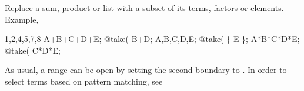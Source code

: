 
Replace a sum, product or list with a subset of its terms, factors or
 elements. Example,
\begin{screen}{1,2,4,5,7,8}
A+B+C+D+E;
@take(%
B+D;
{A,B,C,D,E};
@take(%
\{ E \};
A*B*C*D*E;
@take(%
C*D*E;
\end{screen}
As usual, a range can be open by setting the second boundary to .
In order to select terms based on pattern matching, see  


